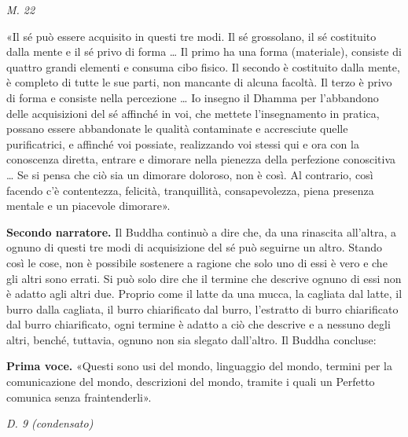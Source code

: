 \emph{M. 22}


«Il sé può essere acquisito in questi tre modi. Il sé grossolano, il sé
costituito dalla mente e il sé privo di forma … Il primo ha una forma
(materiale), consiste di quattro grandi elementi e consuma cibo fisico.
Il secondo è costituito dalla mente, è completo di tutte le sue parti,
non mancante di alcuna facoltà. Il terzo è privo di forma e consiste
nella percezione … Io insegno il Dhamma per l’abbandono delle
acquisizioni del sé affinché in voi, che mettete l’insegnamento in
pratica, possano essere abbandonate le qualità contaminate e accresciute
quelle purificatrici, e affinché voi possiate, realizzando voi stessi
qui e ora con la conoscenza diretta, entrare e dimorare nella pienezza
della perfezione conoscitiva … Se si pensa che ciò sia un dimorare
doloroso, non è così. Al contrario, così facendo c’è contentezza,
felicità, tranquillità, consapevolezza, piena presenza mentale e un
piacevole dimorare».


\textbf{Secondo narratore.} Il Buddha continuò a dire che, da una rinascita
all’altra, a ognuno di questi tre modi di acquisizione del sé può
seguirne un altro. Stando così le cose, non è possibile sostenere a
ragione che solo uno di essi è vero e che gli altri sono errati. Si può
solo dire che il termine che descrive ognuno di essi non è adatto agli
altri due. Proprio come il latte da una mucca, la cagliata dal latte, il
burro dalla cagliata, il burro chiarificato dal burro, l’estratto di
burro chiarificato dal burro chiarificato, ogni termine è adatto a ciò
che descrive e a nessuno degli altri, benché, tuttavia, ognuno non sia
slegato dall’altro. Il Buddha concluse:


\textbf{Prima voce.} «Questi sono usi del mondo, linguaggio del mondo, termini
per la comunicazione del mondo, descrizioni del mondo, tramite i quali
un Perfetto comunica senza fraintenderli».


\emph{D. 9 (condensato)}


